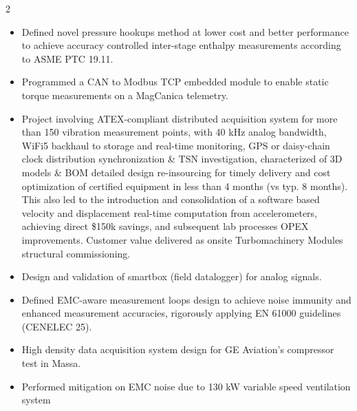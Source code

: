 \documentclass[9.5pt,a4paper,ragged2e,withhyper]{altacv} %
\begin{document}
\begin{paracol}{2}
\begin{itemize}
\item Defined novel pressure hookups method at lower cost and better performance to achieve accuracy controlled inter-stage enthalpy measurements 
according to ASME PTC 19.11. 
\item Programmed a CAN to Modbus TCP embedded module to enable static torque measurements on a MagCanica telemetry.
\end{itemize}
\divider

\begin{itemize}
\item Project involving ATEX-compliant distributed acquisition system for more than 150 vibration measurement points, 
with 40 kHz analog bandwidth, WiFi5 backhaul to storage and real-time monitoring, 
GPS or daisy-chain clock distribution synchronization \& TSN investigation, 
characterized of 3D models \& BOM detailed design re-insourcing for timely delivery and cost optimization of 
certified equipment in less than 4 months (vs typ. 8 months). 
This also led to the introduction and consolidation of a software based velocity and displacement 
real-time computation from accelerometers, achieving direct \$150k savings, and subsequent lab processes OPEX improvements. 
Customer value delivered as onsite Turbomachinery Modules structural commissioning.
\end{itemize}
\divider

\begin{itemize}
\item Design and validation of smartbox (field datalogger) for analog signals. 
\item Defined EMC-aware measurement loops design to achieve noise immunity and enhanced measurement accuracies, 
rigorously applying EN 61000 guidelines (CENELEC 25).
\end{itemize}
\divider

\begin{itemize}
\item High density data acquisition system design for GE Aviation’s compressor test in Massa. 
\item Performed mitigation on EMC noise due to 130 kW variable speed ventilation system
\end{itemize}
\divider


\end{paracol}
\end{document}
